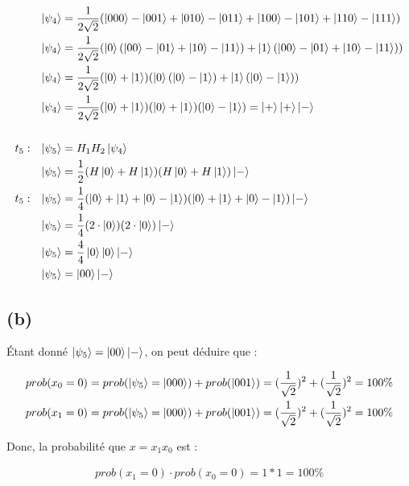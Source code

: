 \documentclass{article}
\begin{document}
\begin{align*}
&&     \ket{\psi_4} &= \frac{1}{2\sqrt{2}}(\ket{000} - \ket{001} + \ket{010} - \ket{011} + \ket{100} - \ket{101} + \ket{110} - \ket{111}) \\ 
&&     \ket{\psi_4} &= \frac{1}{2\sqrt{2}}(\ket{0}(\ket{00} - \ket{01} + \ket{10} - \ket{11}) + \ket{1}(\ket{00} - \ket{01} + \ket{10} - \ket{11})) \\
&&     \ket{\psi_4} &= \frac{1}{2\sqrt{2}}(\ket{0} + \ket{1})(\ket{0}(\ket{0} - \ket{1}) + \ket{1}(\ket{0} - \ket{1})) \\
&&     \ket{\psi_4} &= \frac{1}{2\sqrt{2}}(\ket{0} + \ket{1})(\ket{0} + \ket{1})(\ket{0} - \ket{1}) = \ket{+}\ket{+}\ket{-} \\ \\
&t_5:& \ket{\psi_5} &= H_1H_2\ket{\psi_4} \\
&&     \ket{\psi_5} &= \frac{1}{2}(H\ket{0} + H\ket{1})(H\ket{0} + H\ket{1})\ket{-} \\
&t_5:& \ket{\psi_5} &= \frac{1}{4}(\ket{0} + \ket{1} + \ket{0} - \ket{1})(\ket{0} + \ket{1} + \ket{0} - \ket{1})\ket{-} \\
&&     \ket{\psi_5} &= \frac{1}{4}(2\cdot\ket{0})(2\cdot\ket{0})\ket{-} \\
&&     \ket{\psi_5} &= \frac{4}{4}\ket{0}\ket{0}\ket{-} \\
&&     \ket{\psi_5} &= \ket{00}\ket{-} \\
\end{align*}

\subsection*{(b)}
\begin{flushleft}
    Étant donné $\ket{\psi_5} = \ket{00}\ket{-}$, on peut déduire que : \\
\end{flushleft}
\begin{align*}
    prob(x_0 = 0) = prob(\ket{\psi_5} = \ket{000}) + prob(\ket{001}) = (\frac{1}{\sqrt{2}})^2 + (\frac{1}{\sqrt{2}})^2 = 100\% \\
    prob(x_1 = 0) = prob(\ket{\psi_5} = \ket{000}) + prob(\ket{001}) = (\frac{1}{\sqrt{2}})^2 + (\frac{1}{\sqrt{2}})^2 = 100\%\\
\end{align*}

\begin{flushleft}
    Donc, la probabilité que $x = x_1x_0$ est : \\
\end{flushleft}
    \begin{align*} prob(x_1 = 0)\cdot prob(x_0 = 0) = 1 * 1 = 100\% \end{align*}
\newpage
\end{document}
